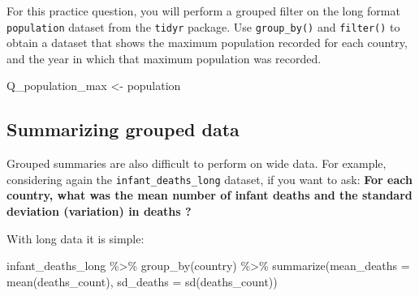 \documentclass[
  letterpaper,
  DIV=11,
  numbers=noendperiod]{scrreprt}
\newenvironment{Shaded}{\begin{snugshade}}{\end{snugshade}}
\newcommand{\AttributeTok}[1]{\textcolor[rgb]{0.40,0.45,0.13}{#1}}
\newcommand{\FunctionTok}[1]{\textcolor[rgb]{0.28,0.35,0.67}{#1}}
\newcommand{\NormalTok}[1]{\textcolor[rgb]{0.00,0.23,0.31}{#1}}
\newcommand{\OtherTok}[1]{\textcolor[rgb]{0.00,0.23,0.31}{#1}}
\newcommand{\SpecialCharTok}[1]{\textcolor[rgb]{0.37,0.37,0.37}{#1}}
\begin{document}
\begin{tcolorbox}[enhanced jigsaw, title=\textcolor{quarto-callout-tip-color}{\faLightbulb}\hspace{0.5em}{Practice}, colbacktitle=quarto-callout-tip-color!10!white, leftrule=.75mm, arc=.35mm, opacityback=0, bottomrule=.15mm, rightrule=.15mm, toptitle=1mm, breakable, toprule=.15mm, colback=white, coltitle=black, colframe=quarto-callout-tip-color-frame, bottomtitle=1mm, titlerule=0mm, left=2mm, opacitybacktitle=0.6]

For this practice question, you will perform a grouped filter on the
long format \texttt{population} dataset from the \texttt{tidyr} package.
Use \texttt{group\_by()} and \texttt{filter()} to obtain a dataset that
shows the maximum population recorded for each country, and the year in
which that maximum population was recorded.

\begin{Shaded}
\begin{Highlighting}[]
\NormalTok{Q\_population\_max }\OtherTok{\textless{}{-}} 
\NormalTok{  population }
\end{Highlighting}
\end{Shaded}

\end{tcolorbox}

\subsection{Summarizing grouped data}\label{summarizing-grouped-data}

Grouped summaries are also difficult to perform on wide data. For
example, considering again the \texttt{infant\_deaths\_long} dataset, if
you want to ask: \textbf{For each country, what was the mean number of
infant deaths and the standard deviation (variation) in deaths ?}

With long data it is simple:

\begin{Shaded}
\begin{Highlighting}[]
\NormalTok{infant\_deaths\_long }\SpecialCharTok{\%\textgreater{}\%} 
  \FunctionTok{group\_by}\NormalTok{(country) }\SpecialCharTok{\%\textgreater{}\%} 
  \FunctionTok{summarize}\NormalTok{(}\AttributeTok{mean\_deaths =} \FunctionTok{mean}\NormalTok{(deaths\_count), }
            \AttributeTok{sd\_deaths =} \FunctionTok{sd}\NormalTok{(deaths\_count))}
\end{Highlighting}
\end{Shaded}
\end{document}
